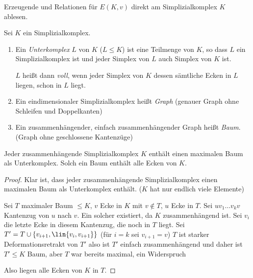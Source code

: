\begin{bemn}[Wollen:]
Erzeugende und Relationen für $E(K,v)$ direkt am Simplizialkomplex $K$ ablesen.
\end{bemn}

\begin{defn}
\label{defn:4.2.7}
Sei $K$ ein Simplizialkomplex.
\begin{enumerate}[label=\arabic{*}.)]
  \item Ein \emph{Unterkomplex} $L$ von $K$ ($L\leqslant K$) ist eine Teilmenge
  von $K$, so dass $L$ ein Simplizialkomplex ist und jeder Simplex von $L$ auch Simplex
  von $K$ ist.

$L$ heißt dann \emph{voll}, wenn jeder Simplex von $K$ dessen sämtliche Ecken
in $L$ liegen, schon in $L$ liegt.
\item Ein eindimensionaler Simplizialkomplex heißt \emph{Graph} (genauer Graph
ohne Schleifen und Doppelkanten)
\item Ein zusammenhängender, einfach zusammenhängender Graph heißt \emph{Baum}.
(Graph ohne geschlossene Kantenzüge)\fishhere
\end{enumerate}
\end{defn}

\begin{lem}
\label{prop:4.2.8}
Jeder zusammenhängende Simplizialkomplex $K$ enthält einen maximalen Baum als
Unterkomplex. Solch ein Baum enthält alle Ecken von $K$.\fishhere
\end{lem}
\begin{proof}
Klar ist, dass jeder zusammenhängende Simplizialkomplex einen maximalen Baum
als Unterkomplex enthält. ($K$ hat nur endlich viele Elemente)

Sei $T$ maximaler
Baum $\leqslant K$, $v$ Ecke in $K$ mit $v\notin T$, $u$ Ecke in $T$. Sei $uv_1\ldots v_k v$ Kantenzug von $u$ nach $v$. Ein solcher
existiert, da $K$ zusammenhängend ist. Sei $v_i$ die letzte Ecke in diesem
Kantenzug, die noch in $T$ liegt. Sei $T' = T\cup
\{v_{i+1},\lin{v_i,v_{i+1}}\}$ (für $i=k$ sei $v_{i+1} = v$)
$T$ ist starker Deformationsretrakt von $T'$ also ist $T'$ einfach
zusammenhängend und daher ist $T'\leqslant K$ Baum, aber $T$ war bereits maximal, ein
Widerspruch\dipper

Also liegen alle Ecken von $K$ in $T$.
\end{proof}

